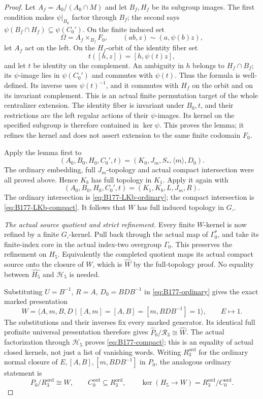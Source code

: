 \begin{proof}
Let \(A_f=A_0/(A_0\cap M)\) and let \(B_f,H_f\) be its
subgroup images. The first condition makes \(\psi|_{B_0}\)
factor through \(B_f\); the second says
\(\psi(B_f\cap H_f)\subseteq\psi(C_0')\).
On the finite induced set
\[
 \Omega=A_f\times_{B_f}F_0,
 \qquad (ab,z)\sim(a,\psi(b)z),
\]
let \(A_f\) act on the left. On the \(H_f\)-orbit of the
identity fiber set
\[
                         t([h,z])=[h,\psi(t)z],
\]
and let \(t\) be identity on the complement. An ambiguity in
\(h\) belongs to \(H_f\cap B_f\); its \(\psi\)-image lies
in \(\psi(C_0')\) and commutes with \(\psi(t)\). Thus the
formula is well-defined. Its inverse uses \(\psi(t)^{-1}\),
and it commutes with \(H_f\) on the orbit and on its invariant
complement. This is an actual finite permutation target of the
whole centralizer extension. The identity fiber is invariant under
\(B_0,t\), and their restrictions are the left regular actions of
their \(\psi\)-images. Its kernel on the specified subgroup is
therefore contained in \(\ker\psi\). This proves the lemma;
it refines the kernel and does not assert extension to the same
finite codomain \(F_0\).

Apply the lemma first to
\[
 (A_0,B_0,H_0,C_0',t)
       =(K_0,J_m,S_*,\langle m\rangle,D_0).
\]
The ordinary embedding, full \(J_m\)-topology and actual compact
intersection were all proved above. Hence \(K_b\) has full
topology in \(K_1\). Apply it again with
\[
 (A_0,B_0,H_0,C_0',t)=(K_1,K_b,L,J_m,R).
\]
The ordinary intersection is \eqref{eq:B177-LKb-ordinary}; the
compact intersection is \eqref{eq:B177-LKb-compact}. It follows
that \(W\) has full induced topology in \(G_\square\).

\emph{The actual source quotient and strict refinement.}
Every finite \(W\)-kernel is now refined by a finite
\(G_\square\)-kernel. Pull back through the actual map of
\(\Gamma_0^*\), and take its finite-index core in the actual
index-two overgroup \(\Gamma_0\). This preserves the refinement
on \(H_5\). Equivalently the completed quotient maps its actual
compact source onto the closure of \(W\), which is
\(\widehat W\) by the full-topology proof. No equality between
\(\widehat{H_5}\) and \(\mathcal H_5\) is needed.

Substituting \(U=B^{-1}\), \(R=A\), \(D_0=BDB^{-1}\)
in \eqref{eq:B177-ordinary} gives the exact marked presentation
\[
 W=\langle A,m,B,D\mid[A,m]=[A,B]=[m,BDB^{-1}]=1\rangle,
 \qquad E\mapsto1.
\]
The substitutions and their inverses fix every marked generator.
Its identical full profinite universal presentation therefore
gives \(\widehat P_0/\mathcal R_3\cong\widehat W\).
The actual factorization through \(\mathcal H_5\) proves
\eqref{eq:B177-compact}; this is an equality of actual closed
kernels, not just a list of vanishing words. Writing \(R_3^{\mathrm{ord}}\) for the ordinary normal closure
of \(E,[A,B],[m,BDB^{-1}]\) in \(P_0\), the analogous ordinary
statement is
\[
 P_0/R_3^{\mathrm{ord}}\cong W,\qquad
 C_0^{\mathrm{ord}}\subseteq R_3^{\mathrm{ord}},\qquad
 \ker(H_5\to W)=R_3^{\mathrm{ord}}/C_0^{\mathrm{ord}}.
\]


\end{proof}
